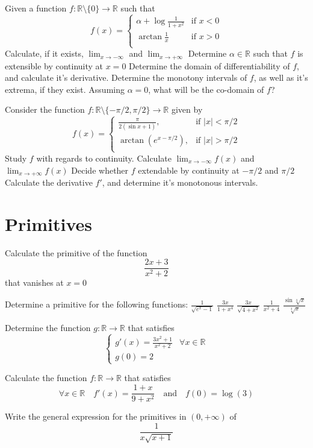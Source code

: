 \documentclass[12pt]{article}
\begin{document}
\begin{ExerciseList}
	\Exercise Given a function $f\colon \mathbb R\setminus\{ 0 \} \to \mathbb R$ such that
	$$f(x)=\begin{cases}\alpha + \log{\frac{1}{1+x^2}} & \mbox{if $x<0$} \\ \arctan{\frac{1}{x}} & \mbox{if $x>0$} \\ \end{cases}$$
	\Question Calculate, if it exists, $\lim_{x\to -\infty}$ and $\lim_{x\to +\infty}$
	\Question Determine $\alpha\in\mathbb R$ such that $f$ is extensible by continuity at $x=0$
	\Question Determine the domain of differentiability of $f$, and calculate it's derivative.
	\Question Determine the monotony intervals of $f$, as well as it's extrema, if they exist.
	\Question Assuming $\alpha=0$, what will be the co-domain of $f$?

	\Exercise Consider the function $f\colon\mathbb R\setminus\{ -\pi/2,\pi/2 \}\to\mathbb R$ given by
	$$f(x)=\begin{cases}\frac{\pi}{2(\sin{x}+1)}, & \mbox{if $|x| < \pi/2$} \\ \arctan(e^{x-\pi/2}), & \mbox{if $|x|>\pi/2$} \\ \end{cases}$$
	\Question Study $f$ with regards to continuity.
	\Question Calculate $\lim_{x\to -\infty}f(x)$ and $\lim_{x\to +\infty}f(x)$
	\Question Decide whether $f$ extendable by continuity at $-\pi/2$ and $\pi/2$
	\Question Calculate the derivative $f'$, and determine it's monotonous intervals.
\end{ExerciseList}

\section{Primitives}
\begin{ExerciseList}
	\Exercise Calculate the primitive of the function $$\frac{2x+3}{x^2+2}$$ that vanishes at $x=0$

	\Exercise Determine a primitive for the following functions:
	\Question $\frac{1}{\sqrt{e^x - 1}}$
	\Question $\frac{3x}{1+x^4}$
	\Question $\frac{3x}{\sqrt{4+x^2}}$
	\Question $\frac{1}{x^2+4}$
	\Question $\frac{\sin{\sqrt[3]{x}}}{\sqrt[3]{x}}$

	\Exercise Determine the function $g\colon \mathbb R \to \mathbb R$ that satisfies
	$$\begin{cases}g'(x)=\frac{3x^2 + 1}{x^2 + 2} & \mbox{$\forall x\in \mathbb R$} \\ g(0)=2\end{cases}$$

	\Exercise Calculate the function $f\colon \mathbb R\to\mathbb R$ that satisfies
	$$\forall x\in\mathbb R\quad f'(x)=\frac{1+x}{9+x^2}\quad\mbox{and}\quad f(0)=\log(3)$$

	\Exercise Write the general expression for the primitives in $(0,+\infty)$ of
	$$\frac{1}{x\sqrt{x+1}}$$
\end{ExerciseList}
\end{document}
